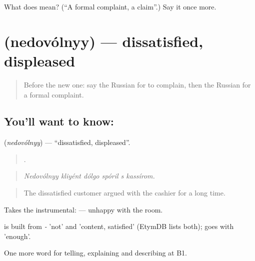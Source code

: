 \begin{tcolorbox}[breakable,colback=teal!4,colframe=teal!35!black,title={Before you move on}]
What does  mean? (\textquotedblleft{}A formal complaint, a claim\textquotedblright{}.) Say it once more.
\end{tcolorbox}
\section[\texorpdfstring{\ru{недовольный} (nedovólnyy)}{недовольный (nedovólnyy)}]{ (nedovólnyy) — dissatisfied, displeased}

\label{lesson:RU-C434-nedovolnyy}



\begin{quote}
Before the new one: say the Russian for to complain, then the Russian for a formal complaint.
\end{quote}

\subsection*{You'll want to know: }
\textbf{} (\emph{nedovólnyy}) — \textquotedblleft{}dissatisfied, displeased\textquotedblright{}.

\begin{quote}
     .
\end{quote}

\begin{quote}
\emph{Nedovólnyy kliyént dólgo spóril s kassírom.}
\end{quote}

\begin{quote}
The dissatisfied customer argued with the cashier for a long time.
\end{quote}

Takes the instrumental: \emph{ } — unhappy with the room.

\begin{cousinweb}
\emph{} is built from \emph{-} 'not' and \emph{} 'content, satisfied' (EtymDB lists both); \emph{} goes with \emph{} 'enough'.
\end{cousinweb}

\begin{grammarlens}[title={What you've built}]
One more word for telling, explaining and describing at B1.
\end{grammarlens}

